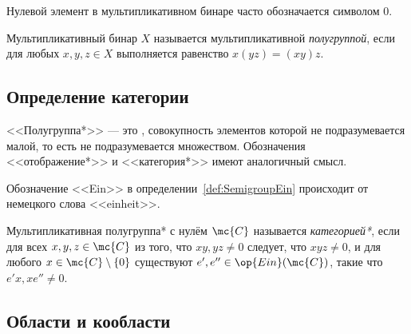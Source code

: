 \documentclass[
	extrafontsizes,
	11pt,
	hyphens,
]{memoir}
\begin{document}
\begin{notation}
Нулевой элемент в мультипликативном бинаре часто обозначается символом \(0\).
\end{notation}

\begin{definition}
Мультипликативный бинар \(X\) называется мультипликативной \emph{полугруппой}, если для любых \(x,y,z \in X\) выполняется равенство \(x(yz) = (xy)z\).
\end{definition}

\subsection{Определение категории}

\begin{notation}
<<Полугруппа*>> --- это , совокупность элементов которой не подразумевается малой, то есть не подразумевается множеством. Обозначения <<отображение*>> и <<категория*>> имеют аналогичный смысл.
\end{notation}


\begin{remark}
Обозначение <<Ein>> в определении~\ref{def:SemigroupEin} происходит от немецкого слова <<einheit>>.
\end{remark}

\begin{definition}
\label{def:CategorySemigroup}
Мультипликативная полугруппа* с нулём \(\mc{C}\) называется \emph{категорией*}, если
для всех \(x, y, z \in \mc{C}\) из того, что \(xy, yz \neq 0\) следует, что \(xyz \neq 0\),
и для любого \(x \in \mc{C} \setminus \{0\}\) существуют \(e', e'' \in \op{Ein}(\mc{C})\), такие что \(e' x, x e'' \neq 0\).
\end{definition}

\subsection{Области и кообласти}
\end{document}
